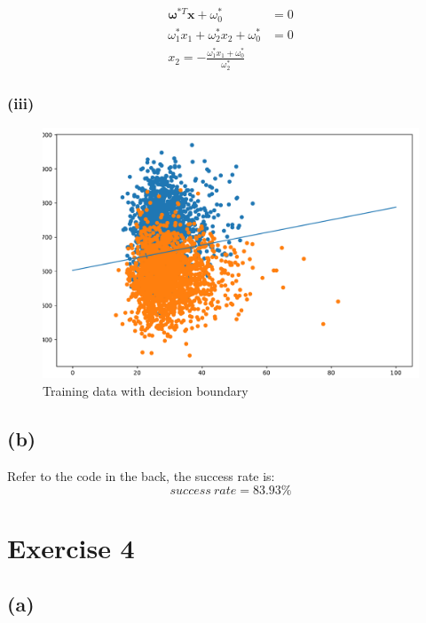 \documentclass[11pt]{article}
\begin{document}
\begin{equation}
\begin{split}
\pmb{\omega}^{*T}\pmb{x}+\omega_0^*&=0\\
\omega_1^*x_1+\omega_2^*x_2+\omega_0^*&=0\\
x_2=-\frac{\omega_1^*x_1+\omega_0^*}{\omega_2^*}
\end{split}
\end{equation}
\subsubsection*{(iii)}
\begin{figure}[h]
	\centering
	\includegraphics[width=0.5\linewidth]{exercise3_2}
	\caption{Training data with decision boundary}
\end{figure}
\subsection*{(b)}
Refer to the code in the back, the success rate is:
$$success\ rate = 83.93\%$$
\pagebreak
\section*{Exercise 4}
\subsection*{(a)}
\end{document}
